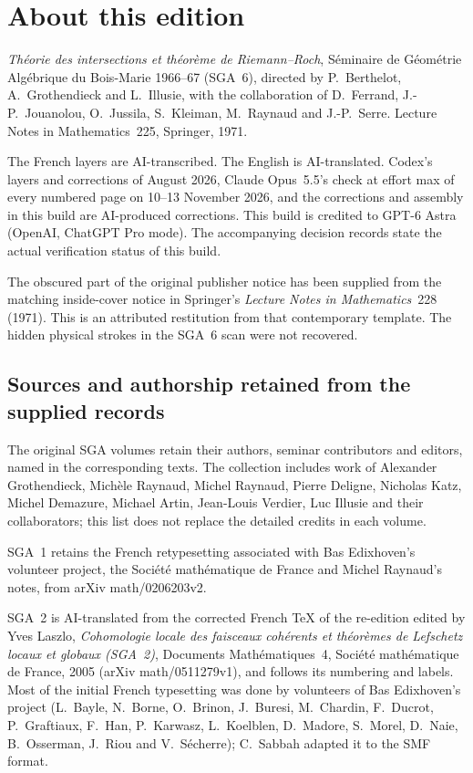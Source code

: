 \section*{About this edition}
\textit{Théorie des intersections et théorème de Riemann--Roch},
Séminaire de Géométrie Algébrique du Bois-Marie 1966--67 (SGA~6),
directed by P.~Berthelot, A.~Grothendieck and L.~Illusie, with the collaboration
of D.~Ferrand, J.-P.~Jouanolou, O.~Jussila, S.~Kleiman, M.~Raynaud and
J.-P.~Serre. Lecture Notes in Mathematics~225, Springer, 1971.

The French layers are AI-transcribed. The English is AI-translated.
Codex's layers and corrections of August 2026, Claude Opus~5.5's check at
effort max of every numbered page on 10--13 November 2026, and the corrections
and assembly in this build are AI-produced corrections. This build is credited
to GPT-6 Astra (OpenAI, ChatGPT Pro mode). The accompanying decision records
state the actual verification status of this build.

The obscured part of the original publisher notice has been supplied from
the matching inside-cover notice in Springer's \textit{Lecture Notes in
Mathematics}~228 (1971). This is an attributed restitution from that
contemporary template. The hidden physical strokes in the SGA~6 scan were
not recovered.

\subsection*{Sources and authorship retained from the supplied records}
The original SGA volumes retain their authors, seminar contributors and
editors, named in the corresponding texts. The collection includes work of
Alexander Grothendieck, Michèle Raynaud, Michel Raynaud, Pierre Deligne,
Nicholas Katz, Michel Demazure, Michael Artin, Jean-Louis Verdier, Luc Illusie
and their collaborators; this list does not replace the detailed credits in
each volume.

SGA~1 retains the French retypesetting associated with Bas Edixhoven's
volunteer project, the Société mathématique de France and Michel Raynaud's
notes, from arXiv math/0206203v2.

SGA~2 is AI-translated from the corrected French TeX of the re-edition edited
by Yves Laszlo, \textit{Cohomologie locale des faisceaux cohérents et théorèmes
de Lefschetz locaux et globaux (SGA~2)}, Documents Mathématiques~4, Société
mathématique de France, 2005 (arXiv math/0511279v1), and follows its numbering
and labels. Most of the initial French typesetting was done by volunteers of
Bas Edixhoven's project (L.~Bayle, N.~Borne, O.~Brinon, J.~Buresi, M.~Chardin,
F.~Ducrot, P.~Graftiaux, F.~Han, P.~Karwasz, L.~Koelblen, D.~Madore, S.~Morel,
D.~Naie, B.~Osserman, J.~Riou and V.~Sécherre); C.~Sabbah adapted it to the
SMF format.

